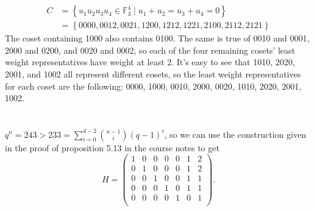 \documentclass[11pt]{article}
\def\F{\mathbb{F}}
\begin{document}
\renewcommand{\thesubsection}{\thesection.\alph{subsection}}
\section{} %
\begin{align*}
	C&=\left\{u_1u_2u_3u_4\in\F_3^4\mid u_1+u_2=u_3+u_4=0\right\}\\
	 &=\left\{0000,0012,0021,1200,1212,1221,2100,2112,2121\right\}
\end{align*}
The coset containing 1000 also contains 0100.
The same is true of 0010 and 0001, 2000 and 0200, and 0020 and 0002, so each of the four remaining cosets' least weight representatives have weight at least 2.
It's easy to see that 1010, 2020, 2001, and 1002 all represent different cosets, so the least weight representatives for each coset are the following:
0000, 1000, 0010, 2000, 0020, 1010, 2020, 2001, 1002.


\section{} %
\subsection{} %
$q^n=243>233=\sum_{i=0}^{d-2}\binom{n-1}{i}\left(q-1\right)^i$, so we can use the construction given in the proof of proposition 5.13 in the course notes to get
\[H=\begin{pmatrix}
	1 & 0 & 0 & 0 & 0 & 1 & 2\\
	0 & 1 & 0 & 0 & 0 & 1 & 2\\
	0 & 0 & 1 & 0 & 0 & 1 & 1\\
	0 & 0 & 0 & 1 & 0 & 1 & 1\\
	0 & 0 & 0 & 0 & 1 & 0 & 1\\
\end{pmatrix}.\]
\end{document}

